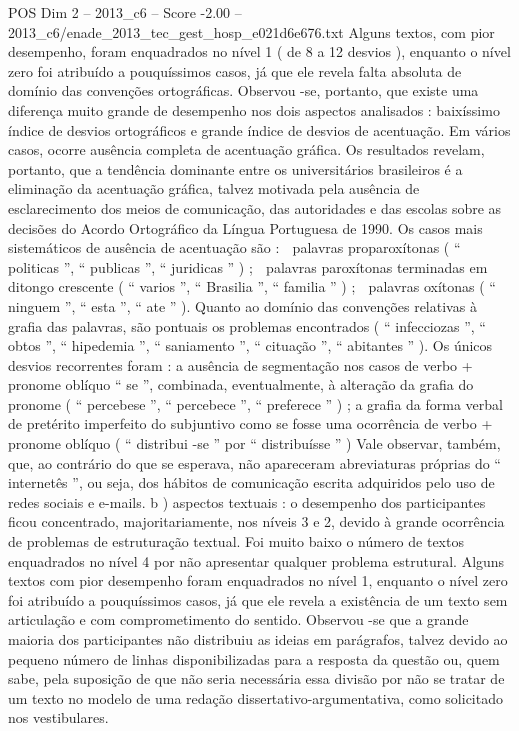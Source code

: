\begin{textsample}{POS Dim 2 – 2013\_c6 – Score -2.00 – 2013\_c6/enade\_2013\_tec\_gest\_hosp\_e021d6e676.txt}
Alguns textos, com pior desempenho, foram enquadrados no nível 1 ( de 8 a 12 desvios ), enquanto o nível zero foi atribuído a pouquíssimos casos, já que ele revela falta absoluta de domínio das convenções ortográficas.
Observou -se, portanto, que existe uma diferença muito grande de desempenho nos dois aspectos analisados : baixíssimo índice de desvios ortográficos e grande índice de desvios de acentuação.
Em vários casos, ocorre ausência completa de acentuação gráfica.
Os resultados revelam, portanto, que a tendência dominante entre os universitários brasileiros é a eliminação da acentuação gráfica, talvez motivada pela ausência de esclarecimento dos meios de comunicação, das autoridades e das escolas sobre as decisões do Acordo Ortográfico da Língua Portuguesa de 1990.
Os casos mais sistemáticos de ausência de acentuação são :  palavras proparoxítonas ( “ politicas ”, “ publicas ”, “ juridicas ” ) ;  palavras paroxítonas terminadas em ditongo crescente ( “ varios ”, “ Brasilia ”, “ familia ” ) ;  palavras oxítonas ( “ ninguem ”, “ esta ”, “ ate ” ).
Quanto ao domínio das convenções relativas à grafia das palavras, são pontuais os problemas encontrados ( “ infecciozas ”, “ obtos ”, “ hipedemia ”, “ saniamento ”, “ cituação ”, “ abitantes ” ).
Os únicos desvios recorrentes foram : a ausência de segmentação nos casos de verbo + pronome oblíquo “ se ”, combinada, eventualmente, à alteração da grafia do pronome ( “ percebese ”, “ percebece ”, “ preferece ” ) ; a grafia da forma verbal de pretérito imperfeito do subjuntivo como se fosse uma ocorrência de verbo + pronome oblíquo ( “ distribui -se ” por “ distribuísse ” ) Vale observar, também, que, ao contrário do que se esperava, não apareceram abreviaturas próprias do “ internetês ”, ou seja, dos hábitos de comunicação escrita adquiridos pelo uso de redes sociais e e-mails. b ) aspectos textuais : o desempenho dos participantes ficou concentrado, majoritariamente, nos níveis 3 e 2, devido à grande ocorrência de problemas de estruturação textual.
Foi muito baixo o número de textos enquadrados no nível 4 por não apresentar qualquer problema estrutural.
Alguns textos com pior desempenho foram enquadrados no nível 1, enquanto o nível zero foi atribuído a pouquíssimos casos, já que ele revela a existência de um texto sem articulação e com comprometimento do sentido.
Observou -se que a grande maioria dos participantes não distribuiu as ideias em parágrafos, talvez devido ao pequeno número de linhas disponibilizadas para a resposta da questão ou, quem sabe, pela suposição de que não seria necessária essa divisão por não se tratar de um texto no modelo de uma redação dissertativo-argumentativa, como solicitado nos vestibulares.

\end{textsample}
